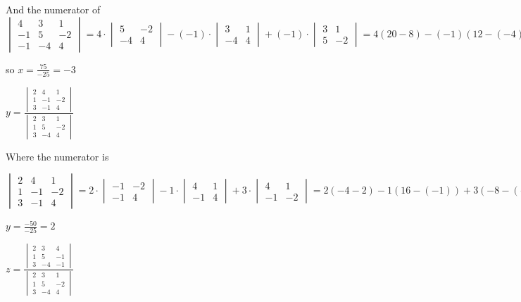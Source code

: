 \documentclass[]{report}
\begin{document}
And the numerator of $
\begin{vmatrix}
4 & 3 & 1\\
-1 & 5 & -2 \\
-1 & -4 & 4
\end{vmatrix} = 4 \cdot \begin{vmatrix}
5 & -2 \\
-4 & 4
\end{vmatrix}
- (-1)\cdot \begin{vmatrix}
3 & 1 \\
-4 & 4
\end{vmatrix}
+ (-1)\cdot \begin{vmatrix}
3 & 1 \\
5 & -2
\end{vmatrix} = 4(20 - 8) - (-1)(12 - (-4)) + (-1)(-6 - 5) = 4(12) - (-1)(16) + (-1)(-11) = 4(12) + 16 + 11 = 75
$

so $x = \frac{75}{-25} = -3$


$y = \frac{
	\begin{vmatrix}
	2 & 4 & 1\\
	1 & -1 & -2 \\
	3 & -1 & 4
	\end{vmatrix}
}{
	\begin{vmatrix}
	2 & 3 & 1\\
	1 &  5 & -2 \\
	3 & -4 & 4
	\end{vmatrix}
}$

Where the numerator is 

$	\begin{vmatrix}
2 & 4 & 1\\
1 & -1 & -2 \\
3 & -1 & 4
\end{vmatrix} = 2 \cdot \begin{vmatrix}
-1 & -2 \\
-1 & 4
\end{vmatrix}
- 1 \cdot \begin{vmatrix}
4 & 1\\
-1 & 4
\end{vmatrix}
+ 3 \cdot \begin{vmatrix}
4 & 1 \\
-1 & -2
\end{vmatrix}
= 2(-4 -2) - 1(16 - (-1)) + 3(-8 - (-1)) = 2(-6) - 1(17) + 3(-7) = -12 - 17 - 21 = -50 
$

$ y = \frac{-50}{-25} = 2$


$z = \frac{
	\begin{vmatrix}
	2 & 3 & 4\\
	1 & 5 & -1 \\
	3 & -4 & -1
	\end{vmatrix}
}{
	\begin{vmatrix}
	2 & 3 & 1\\
	1 &  5 & -2 \\
	3 & -4 & 4
	\end{vmatrix}
}$
\end{document}
